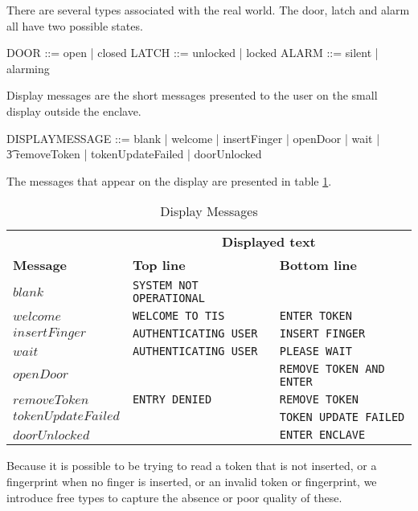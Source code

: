 There are several types associated with the real world. The door,
latch and alarm all have two possible states.
\begin{zed}
	DOOR ::= open | closed
\also
	LATCH ::= unlocked | locked
\also
	ALARM ::= silent | alarming
\end{zed}

Display messages are the short messages presented to the user on the
small display outside the enclave.
\begin{zed}
	DISPLAYMESSAGE ::= blank | welcome | insertFinger | openDoor |
                        wait | 
\\      \t3  removeToken | tokenUpdateFailed | doorUnlocked
\end{zed}

The messages that appear on the display are presented in table \ref{table:display}.

\begin{table}[h]
\begin{tabular}{|l|l|l|}
                & \multicolumn{2}{c|}{\bf Displayed text} \\ \cline{2-3}
{\bf Message}   & {\bf Top line}                & {\bf Bottom line}     \\
\hline
$blank$         & {\tt SYSTEM NOT OPERATIONAL}  & \\
$welcome$       & {\tt WELCOME TO TIS}          & {\tt ENTER TOKEN}  \\
$insertFinger$  & {\tt AUTHENTICATING USER}     & {\tt INSERT FINGER} \\ 
$wait$          & {\tt AUTHENTICATING USER}     & {\tt PLEASE WAIT} \\
$openDoor$      & {\tt }                        & {\tt REMOVE TOKEN AND ENTER} \\
$removeToken$   & {\tt ENTRY DENIED}            & {\tt REMOVE TOKEN} \\
$tokenUpdateFailed$ &                   & {\tt TOKEN UPDATE FAILED }
\\
$doorUnlocked$  &                       & {\tt ENTER ENCLAVE} \\
\hline
\end{tabular}
\caption{Display Messages}
\label{table:display}
\end{table}

Because it is possible to be trying to read a token that is not inserted,
or a fingerprint when no finger is inserted,
or an invalid token or fingerprint, 
we introduce free types to capture the absence or poor quality of these.

